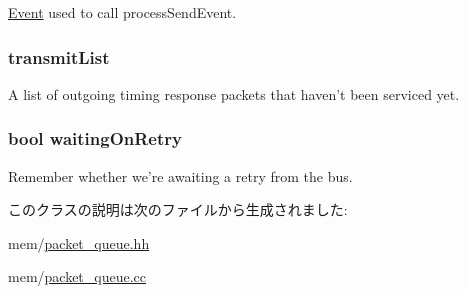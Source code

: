 \label{classPacketQueue_a2fc6007386af1667bd97ee56a71079fb}
\hyperlink{classEvent}{Event} used to call processSendEvent. \hypertarget{classPacketQueue_a32a79d68b8d8f4f33bc27f59809eeae7}{
\subsubsection[{transmitList}]{ {\bf transmitList}}}
\label{classPacketQueue_a32a79d68b8d8f4f33bc27f59809eeae7}
A list of outgoing timing response packets that haven't been serviced yet. \hypertarget{classPacketQueue_ad4363dd8230c71676c4cad8dd5a0b8a7}{
\subsubsection[{waitingOnRetry}]{\setlength{\rightskip}{0pt plus 5cm}bool {\bf waitingOnRetry}}}
\label{classPacketQueue_ad4363dd8230c71676c4cad8dd5a0b8a7}
Remember whether we're awaiting a retry from the bus. 

このクラスの説明は次のファイルから生成されました:\begin{DoxyCompactItemize}
\item 
mem/\hyperlink{packet__queue_8hh}{packet\_\-queue.hh}\item 
mem/\hyperlink{packet__queue_8cc}{packet\_\-queue.cc}\end{DoxyCompactItemize}
